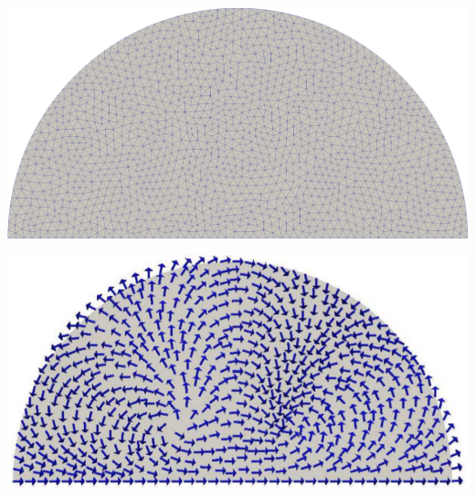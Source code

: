 \documentclass[a0paper,portrait, fontscale=0.30]{baposter}
\begin{document}
\begin{poster}
{%

\captionsetup{width=0.13\linewidth}
\captionsetup{labelformat=empty}
\noindent
\begin{minipage}[b]{0.13\linewidth}
\includegraphics[width=0.99\linewidth]{1}
\label{fig:figure1}
\end{minipage}
\begin{minipage}[b]{0.13\linewidth}
\includegraphics[width=0.99\linewidth]{2}

\end{minipage}}
\end{poster}
\end{document}
